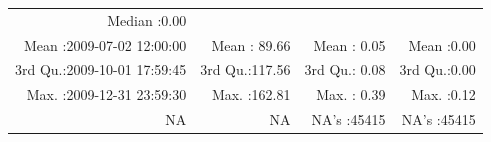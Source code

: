 \documentclass[
  10pt,
  a4paper,oneside]{article}
\begin{document}
\begin{longtable}[]{@{}rrrr@{}}
\begin{minipage}[t]{0.18\columnwidth}
Median :0.00\strut
\end{minipage}\tabularnewline
\begin{minipage}[t]{0.34\columnwidth}\raggedleft
Mean :2009-07-02 12:00:00\strut
\end{minipage} & \begin{minipage}[t]{0.19\columnwidth}\raggedleft
Mean : 89.66\strut
\end{minipage} & \begin{minipage}[t]{0.18\columnwidth}\raggedleft
Mean : 0.05\strut
\end{minipage} & \begin{minipage}[t]{0.18\columnwidth}\raggedleft
Mean :0.00\strut
\end{minipage}\tabularnewline
\begin{minipage}[t]{0.34\columnwidth}\raggedleft
3rd Qu.:2009-10-01 17:59:45\strut
\end{minipage} & \begin{minipage}[t]{0.19\columnwidth}\raggedleft
3rd Qu.:117.56\strut
\end{minipage} & \begin{minipage}[t]{0.18\columnwidth}\raggedleft
3rd Qu.: 0.08\strut
\end{minipage} & \begin{minipage}[t]{0.18\columnwidth}\raggedleft
3rd Qu.:0.00\strut
\end{minipage}\tabularnewline
\begin{minipage}[t]{0.34\columnwidth}\raggedleft
Max. :2009-12-31 23:59:30\strut
\end{minipage} & \begin{minipage}[t]{0.19\columnwidth}\raggedleft
Max. :162.81\strut
\end{minipage} & \begin{minipage}[t]{0.18\columnwidth}\raggedleft
Max. : 0.39\strut
\end{minipage} & \begin{minipage}[t]{0.18\columnwidth}\raggedleft
Max. :0.12\strut
\end{minipage}\tabularnewline
\begin{minipage}[t]{0.34\columnwidth}\raggedleft
NA\strut
\end{minipage} & \begin{minipage}[t]{0.19\columnwidth}\raggedleft
NA\strut
\end{minipage} & \begin{minipage}[t]{0.18\columnwidth}\raggedleft
NA's :45415\strut
\end{minipage} & \begin{minipage}[t]{0.18\columnwidth}\raggedleft
NA's :45415\strut
\end{minipage}\tabularnewline
\bottomrule
\end{longtable}
\end{document}
